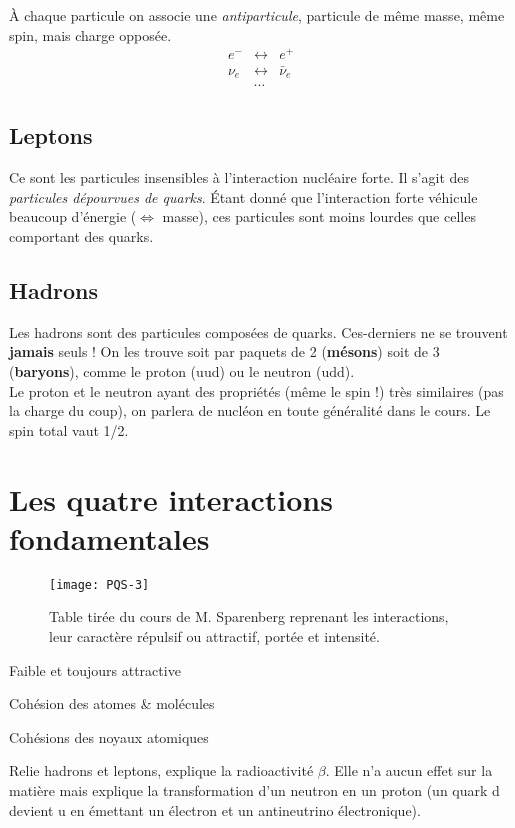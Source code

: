 \documentclass[11pt]{book}
\begin{document}
À chaque particule on associe une \textit{antiparticule}, particule de même masse, même spin, mais charge opposée. \\
\begin{eqnarray*}
e^- &\leftrightarrow& e^+ \\
\nu_e &\leftrightarrow& \bar{\nu}_e \\
&\cdots&
\end{eqnarray*}
\subsection{Leptons}
Ce sont les particules insensibles à l'interaction nucléaire forte. Il s'agit des \textit{particules dépourvues de quarks}. Étant donné que l'interaction forte véhicule beaucoup d'énergie ($\Leftrightarrow$ masse), ces particules sont moins lourdes que celles comportant des quarks.
\subsection{Hadrons}
Les hadrons sont des particules composées de quarks. Ces-derniers ne se trouvent \textbf{jamais} seuls ! On les trouve soit par paquets de 2 (\textbf{mésons}) soit de 3 (\textbf{baryons}), comme le proton ($\mathrm{uud}$) ou le neutron ($\mathrm{udd}$). \\

Le proton et le neutron ayant des propriétés (même le spin !) très similaires (pas la charge du coup), on parlera de nucléon en toute généralité dans le cours. Le spin total vaut 1/2. 

\section{Les quatre interactions fondamentales}
\begin{figure}[h!]
\centering
\texttt{[image: PQS-3]}
\caption{Table tirée du cours de M. Sparenberg reprenant les interactions, leur caractère répulsif ou attractif, portée et intensité.}
\label{fig : interactions fond}
\end{figure}
\begin{description}[align=right, labelwidth = 3cm]
\item[Gravitationnelle] Faible et toujours attractive
\item[Électromagnétique] Cohésion des atomes \& molécules
\item[Nucléaire forte] Cohésions des noyaux atomiques 
\item[Nucléaire faible] Relie hadrons et leptons, explique la radioactivité $\beta$. Elle n'a aucun effet sur la matière mais explique la transformation d'un neutron en un proton (un quark d devient u en émettant un électron et un antineutrino électronique).
\end{description}
\end{document}
